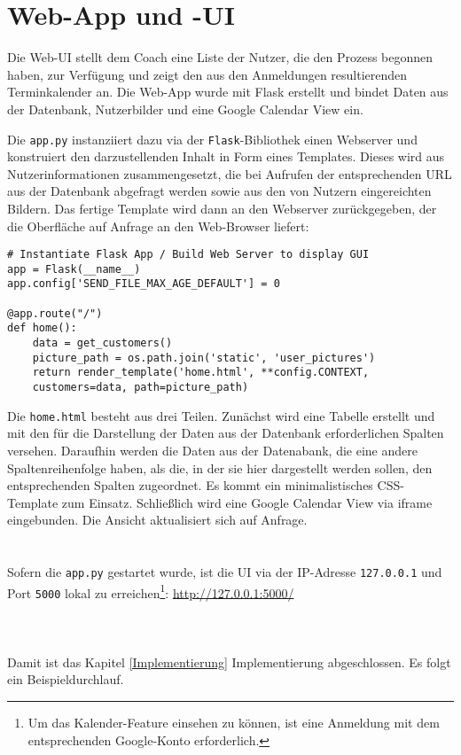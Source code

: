     
    \section{Web-App und -UI}
        Die Web-UI stellt dem Coach eine Liste der Nutzer, die den Prozess begonnen haben, zur Verfügung und zeigt den aus den Anmeldungen resultierenden Terminkalender an. Die Web-App wurde mit Flask erstellt und bindet Daten aus der Datenbank, Nutzerbilder und eine Google Calendar View ein.
        
        Die \verb|app.py| instanziiert dazu via der \verb|Flask|-Bibliothek einen Webserver und konstruiert den darzustellenden Inhalt in Form eines Templates. Dieses wird aus Nutzerinformationen zusammengesetzt, die bei Aufrufen der entsprechenden URL aus der Datenbank abgefragt werden sowie aus den von Nutzern eingereichten Bildern. 
        Das fertige Template wird dann an den Webserver zurückgegeben, der die Oberfläche auf Anfrage an den Web-Browser liefert:

        \begin{lstlisting}
# Instantiate Flask App / Build Web Server to display GUI
app = Flask(__name__)
app.config['SEND_FILE_MAX_AGE_DEFAULT'] = 0

@app.route("/")
def home():
    data = get_customers()
    picture_path = os.path.join('static', 'user_pictures')
    return render_template('home.html', **config.CONTEXT, 
    customers=data, path=picture_path)
        \end{lstlisting}

        Die \verb|home.html| besteht aus drei Teilen. Zunächst wird eine Tabelle erstellt und mit den für die Darstellung der Daten aus der Datenbank erforderlichen Spalten versehen. Daraufhin werden die Daten aus der Datenabank, die eine andere Spaltenreihenfolge haben, als die, in der sie hier dargestellt werden sollen, den entsprechenden Spalten zugeordnet. Es kommt ein minimalistisches CSS-Template zum Einsatz.
        Schließlich wird eine Google Calendar View via iframe eingebunden. Die Ansicht aktualisiert sich auf Anfrage. \\
        \\ \\

        Sofern die \verb|app.py| gestartet wurde, ist die UI via der IP-Adresse \verb|127.0.0.1| und Port \verb|5000| lokal zu erreichen\footnote{Um das Kalender-Feature einsehen zu können, ist eine Anmeldung mit dem entsprechenden Google-Konto erforderlich.}: \url{http://127.0.0.1:5000/} \\ \\ \\ \\


    Damit ist das Kapitel \ref*{Implementierung} Implementierung abgeschlossen. Es folgt ein Beispieldurchlauf.


